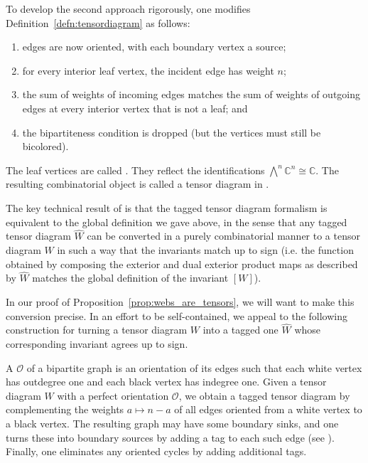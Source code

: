 To develop the second approach rigorously, one modifies Definition~\ref{defn:tensordiagram} as follows: 
\begin{enumerate}
    \item edges are now oriented, with each boundary vertex a source;
    \item for every interior leaf vertex, the incident edge has weight $n$; 
    \item the sum of weights of incoming edges matches the sum of weights of outgoing edges at every interior vertex that is not a leaf; and 
    \item the bipartiteness condition is dropped (but the vertices must still be bicolored).
\end{enumerate} 
The leaf vertices are called . They reflect the identifications $\bigwedge^n \mathbb{C}^n \cong \mathbb{C}$. The resulting combinatorial object is called a  tensor diagram in \cite{Fraser.Lam.Le}. 

The key technical result of \cite{Fraser.Lam.Le} is that the tagged tensor diagram formalism is equivalent to the global definition we gave above, in the sense that any tagged tensor diagram $\widehat{W}$ can be converted in a purely combinatorial manner to a tensor diagram $W$ in such a way that the invariants match up to sign (i.e. the function obtained by composing the exterior and dual exterior product maps as described by $\widehat{W}$ matches the global definition of the invariant $[W]$). 

In our proof of Proposition~\ref{prop:webs_are_tensors}, we will want to make this conversion precise. 
In an effort to be self-contained, we appeal to the following construction \cite[Remark 3.3]{Fraser.Lam.Le} for turning a tensor diagram $W$ into a tagged one $\widehat{W}$ whose corresponding invariant agrees up to sign. 

A  $\mathcal{O}$ of a bipartite graph is an orientation of its edges such that each white vertex has outdegree one and each black vertex has indegree one. Given a tensor diagram $W$ with a perfect orientation $\mathcal{O}$, we obtain a tagged tensor diagram 
by complementing the weights $a \mapsto n-a$ of all edges oriented from a white vertex to a black vertex. The resulting graph may have some boundary sinks, and one turns these into boundary sources by adding a tag to each such edge (see \cite[Eq.~(3.3)]{Fraser.Lam.Le}). Finally, one eliminates any oriented cycles by adding additional tags.



